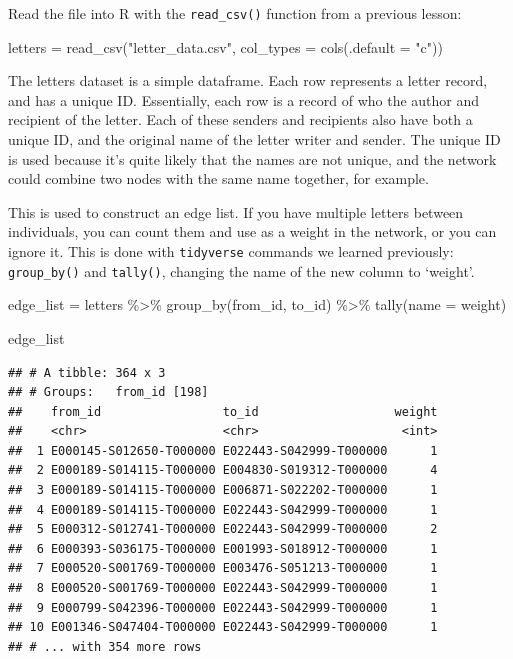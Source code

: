 \documentclass[
]{book}
\newenvironment{Shaded}{\begin{snugshade}}{\end{snugshade}}
\newcommand{\AttributeTok}[1]{\textcolor[rgb]{0.77,0.63,0.00}{#1}}
\newcommand{\FunctionTok}[1]{\textcolor[rgb]{0.00,0.00,0.00}{#1}}
\newcommand{\NormalTok}[1]{#1}
\newcommand{\OtherTok}[1]{\textcolor[rgb]{0.56,0.35,0.01}{#1}}
\newcommand{\SpecialCharTok}[1]{\textcolor[rgb]{0.00,0.00,0.00}{#1}}
\newcommand{\StringTok}[1]{\textcolor[rgb]{0.31,0.60,0.02}{#1}}
\begin{document}
Read the file into R with the \texttt{read\_csv()} function from a previous lesson:

\begin{Shaded}
\begin{Highlighting}[]
\NormalTok{letters }\OtherTok{=} \FunctionTok{read\_csv}\NormalTok{(}\StringTok{"letter\_data.csv"}\NormalTok{, }\AttributeTok{col\_types =} \FunctionTok{cols}\NormalTok{(}\AttributeTok{.default =} \StringTok{"c"}\NormalTok{))}
\end{Highlighting}
\end{Shaded}

The letters dataset is a simple dataframe. Each row represents a letter record, and has a unique ID. Essentially, each row is a record of who the author and recipient of the letter. Each of these senders and recipients also have both a unique ID, and the original name of the letter writer and sender. The unique ID is used because it's quite likely that the names are not unique, and the network could combine two nodes with the same name together, for example.

This is used to construct an edge list. If you have multiple letters between individuals, you can count them and use as a weight in the network, or you can ignore it. This is done with \texttt{tidyverse} commands we learned previously: \texttt{group\_by()} and \texttt{tally()}, changing the name of the new column to `weight'.

\begin{Shaded}
\begin{Highlighting}[]
\NormalTok{edge\_list }\OtherTok{=}\NormalTok{ letters }\SpecialCharTok{\%\textgreater{}\%} 
  \FunctionTok{group\_by}\NormalTok{(from\_id, to\_id) }\SpecialCharTok{\%\textgreater{}\%} 
  \FunctionTok{tally}\NormalTok{(}\AttributeTok{name =} \StringTok{\textquotesingle{}weight\textquotesingle{}}\NormalTok{)}

\NormalTok{edge\_list}
\end{Highlighting}
\end{Shaded}

\begin{verbatim}
## # A tibble: 364 x 3
## # Groups:   from_id [198]
##    from_id                 to_id                   weight
##    <chr>                   <chr>                    <int>
##  1 E000145-S012650-T000000 E022443-S042999-T000000      1
##  2 E000189-S014115-T000000 E004830-S019312-T000000      4
##  3 E000189-S014115-T000000 E006871-S022202-T000000      1
##  4 E000189-S014115-T000000 E022443-S042999-T000000      1
##  5 E000312-S012741-T000000 E022443-S042999-T000000      2
##  6 E000393-S036175-T000000 E001993-S018912-T000000      1
##  7 E000520-S001769-T000000 E003476-S051213-T000000      1
##  8 E000520-S001769-T000000 E022443-S042999-T000000      1
##  9 E000799-S042396-T000000 E022443-S042999-T000000      1
## 10 E001346-S047404-T000000 E022443-S042999-T000000      1
## # ... with 354 more rows
\end{verbatim}
\end{document}
